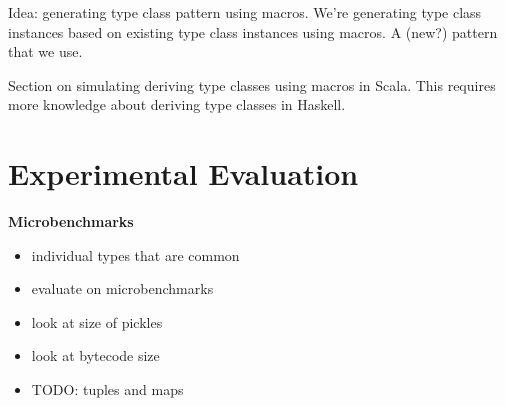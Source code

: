 \documentclass[preprint,10pt]{sigplanconf}
\theoremstyle{definition}
\begin{document}
Idea: generating type class pattern using macros. We're generating type class instances based on existing type class instances using macros. A (new?) pattern that we use.

Section on simulating deriving type classes using macros in Scala. This requires more knowledge about deriving type classes in Haskell.

\section{Experimental Evaluation}

{\bf Microbenchmarks}

\begin{itemize}
\item individual types that are common
\item evaluate on microbenchmarks
\item look at size of pickles
\item look at bytecode size
\item TODO: tuples and maps
\end{itemize}
\end{document}

